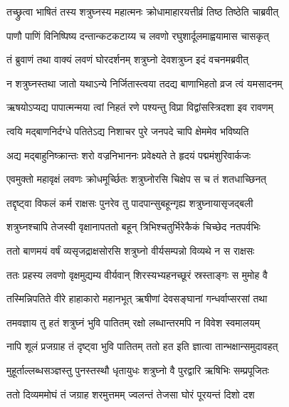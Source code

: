 
\twolineshloka
{तच्छ्रुत्वा भाषितं तस्य शत्रुघ्नस्य महात्मनः}
{क्रोधामाहारयत्तीव्रं तिष्ठ तिष्ठेति चाब्रवीत्} %

\twolineshloka
{पाणौ पाणिं विनिष्पिष्य दन्तान्कटकटाय्य च}
{लवणो रघुशार्दूलमाह्वयामास चासकृत्} %

\twolineshloka
{तं ब्रुवाणं तथा वाक्यं लवणं घोरदर्शनम्}
{शत्रुघ्नो देवशत्रुघ्न इदं वचनमब्रवीत्} %

\twolineshloka
{न शत्रुघ्नस्तथा जातो यथाऽन्ये निर्जितास्त्वया}
{तदद्य बाणाभिहतो व्रज त्वं यमसादनम्} %

\twolineshloka
{ऋषयोऽप्यद्य पापात्मन्मया त्वां निहतं रणे}
{पश्यन्तु विप्रा विद्वांसस्त्रिदशा इव रावणम्} %

\twolineshloka
{त्वयि मद्बाणनिर्दग्धे पतितेऽद्य निशाचर}
{पुरे जनपदे चापि क्षेममेव भविष्यति} %

\twolineshloka
{अद्य मद्बाहुनिष्क्रान्तः शरो वज्रनिभाननः}
{प्रवेक्ष्यते ते हृदयं पद्ममंशुरिवार्कजः} %

\twolineshloka
{एवमुक्तो महावृक्षं लवणः क्रोधमूर्च्छितः}
{शत्रुघ्नोरसि चिक्षेप स च तं शतधाच्छिनत्} %

\twolineshloka
{तद्दृष्ट्वा विफलं कर्म राक्षसः पुनरेव तु}
{पादपान्सुबहून्गृह्य शत्रुघ्नायासृजद्बली} %

\twolineshloka
{शत्रुघ्नश्चापि तेजस्वी वृक्षानापततो बहून्}
{त्रिभिश्चतुर्भिरेकैकं चिच्छेद नतपर्वभिः} %

\twolineshloka
{ततो बाणमयं वर्षं व्यसृजद्राक्षसोरसि}
{शत्रुघ्नो वीर्यसम्पन्नो विव्यथे न स राक्षसः} %

\twolineshloka
{ततः प्रहस्य लवणो वृक्षमुद्यम्य वीर्यवान्}
{शिरस्यभ्यहनच्छूरं स्रस्ताङ्गः स मुमोह वै} %

\twolineshloka
{तस्मिन्निपतिते वीरे हाहाकारो महानभूत्}
{ऋषीणां देवसङ्घानां गन्धर्वाप्सरसां तथा} %

\twolineshloka
{तमवज्ञाय तु हतं शत्रुघ्नं भुवि पातितम्}
{रक्षो लब्धान्तरमपि न विवेश स्वमालयम्} %

\twolineshloka
{नापि शूलं प्रजग्राह तं दृष्ट्वा भुवि पातितम्}
{ततो हत इति ज्ञात्वा तान्भक्षान्समुदावहत्} %

\twolineshloka
{मुहूर्ताल्लब्धसञ्ज्ञस्तु पुनस्तस्थौ धृतायुधः}
{शत्रुघ्नो वै पुरद्वारि ऋषिभिः सम्प्रपूजितः} %

\twolineshloka
{ततो दिव्यममोघं तं जग्राह शरमुत्तमम्}
{ज्वलन्तं तेजसा घोरं पूरयन्तं दिशो दश} %

